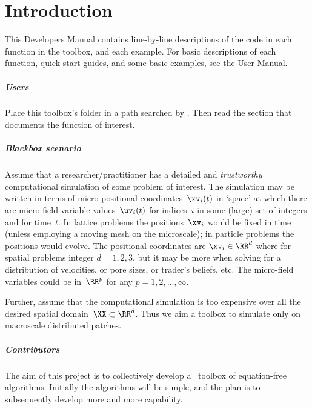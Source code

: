 \chapter{Introduction}


\begin{devMan}
This Developers Manual contains line-by-line descriptions of the code in each function in the toolbox, and each example.  For basic descriptions of each function, quick start guides, and some basic examples, see the User Manual.
\end{devMan}


\paragraph{Users}
Place this toolbox's folder in a path searched by \script.
Then read the section that documents the function of interest.


\paragraph{Blackbox scenario}
Assume that a researcher\slash practitioner has a detailed and \emph{trustworthy} computational simulation of some problem of interest.
The simulation may be written in terms of micro-positional coordinates~\(\xv_i(t)\) in `space' at which there are micro-field variable values~\(\uv_i(t)\) for indices~\(i\) in some (large) set of integers and for time~\(t\).
In lattice problems the positions~\(\xv_i\) would be fixed in time (unless employing a moving mesh on the microscale); in particle problems the positions would evolve.
The positional coordinates are \(\xv_i\in\RR^{d}\) where for spatial problems integer \(d=1,2,3\), but it may be more when solving for a distribution of velocities, or pore sizes, or trader's beliefs, etc.
The micro-field variables could be in~\(\RR^{p}\) for any \(p=1,2,\ldots,\infty\).

Further, assume that the computational simulation is too expensive over all the desired spatial domain~\(\XX\subset\RR^{d}\).
Thus we aim a toolbox to simulate only on macroscale distributed patches.



\paragraph{Contributors}
The aim of this project is to collectively develop a \script\ toolbox of equation-free algorithms.
Initially the algorithms will be simple, and the plan is to subsequently develop more and more capability.

